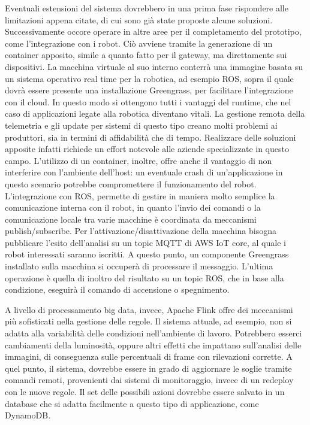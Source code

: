 Eventuali estensioni del sistema dovrebbero in una prima fase rispondere alle limitazioni appena citate, di cui sono già state proposte alcune soluzioni. Successivamente occore operare in altre aree per il completamento del prototipo, come l'integrazione con i robot. Ciò avviene tramite la generazione di un container apposito, simile a quanto fatto per il gateway, ma direttamente sui dispositivi. La macchina virtuale al suo interno conterrà una immagine basata su un sistema operativo real time per la robotica, ad esempio ROS, sopra il quale dovrà essere presente una installazione Greengrass, per facilitare l'integrazione con il cloud. In questo modo si ottengono tutti i vantaggi del runtime, che nel caso di applicazioni legate alla robotica diventano vitali. La gestione remota della telemetria e gli update per sistemi di questo tipo creano molti problemi ai produttori, sia in termini di affidabilità che di tempo. Realizzare delle soluzioni apposite infatti richiede un effort notevole alle aziende specializzate in questo campo. L'utilizzo di un container, inoltre, offre anche il vantaggio di non interferire con l'ambiente dell'host: un eventuale crash di un'applicazione in questo scenario potrebbe compromettere il funzionamento del robot. L'integrazione con ROS, permette di gestire in maniera molto semplice la comunicazione interna con il robot, in quanto l'invio dei comandi o la comunicazione locale tra varie macchine è coordinata da meccanismi publish/subscribe. Per l'attivazione/disattivazione della macchina bisogna pubblicare l'esito dell'analisi su un topic MQTT di AWS IoT core, al quale i robot interessati saranno iscritti. A questo punto, un componente Greengrass installato sulla macchina si occuperà di processare il messaggio. L'ultima operazione è quella di inoltro del risultato su un topic ROS, che in base alla condizione, eseguirà il comando di accensione o spegnimento.

A livello di processamento big data, invece, Apache Flink offre dei meccanismi più sofisticati nella gestione delle regole. Il sistema attuale, ad esempio, non si adatta alla variabilità delle condizioni nell'ambiente di lavoro. Potrebbero esserci cambiamenti della luminosità, oppure altri effetti che impattano sull'analisi delle immagini, di conseguenza sulle percentuali di frame con rilevazioni corrette. A quel punto, il sistema, dovrebbe essere in grado di aggiornare le soglie tramite comandi remoti, provenienti dai sistemi di monitoraggio, invece di un redeploy con le nuove regole. Il set delle possibili azioni dovrebbe essere salvato in un database che si adatta facilmente a questo tipo di applicazione, come DynamoDB. 

